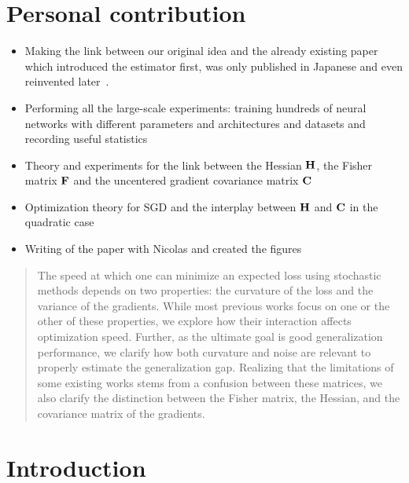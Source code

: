 \section*{Personal contribution}
\begin{itemize}
    \item Making the link between our original idea and the already existing paper \citet{takeuchi1976distribution} which introduced the estimator first, was only published in Japanese and even reinvented later~\citep{murata1994network}.
    \item Performing all the large-scale experiments: training hundreds of neural networks with different parameters and architectures and datasets and recording useful statistics
    \item Theory and experiments for the link between the Hessian ${\mathbf{H}}$, the Fisher matrix ${\mathbf{F}}$ and the uncentered gradient covariance matrix ${\mathbf{C}}$
    \item Optimization theory for SGD and the interplay between ${\mathbf{H}}$ and ${\mathbf{C}}$ in the quadratic case
    \item Writing of the paper with Nicolas and created the figures
\end{itemize}

\begin{abstract}
    The speed at which one can minimize an expected loss using stochastic methods depends on two properties: the curvature of the loss and the variance of the gradients. While most previous works focus on one or the other of these properties, we explore how their interaction affects optimization speed. Further, as the ultimate goal is good generalization performance, we clarify how both curvature and noise are relevant to properly estimate the generalization gap. Realizing that the limitations of some existing works stems from a confusion between these matrices, we also clarify the distinction between the Fisher matrix, the Hessian, and the covariance matrix of the gradients.
\end{abstract}

\setcounter{footnote}{0}

\section{Introduction}


